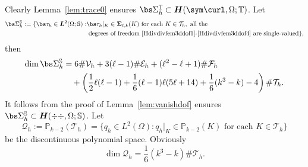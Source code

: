 Clearly Lemma~\ref{lem:trace0} ensures $\bs\Sigma_h^{\mathbb T}\subset \boldsymbol H(\sym\curl,\Omega;\mathbb T)$. 
%
Let
\begin{align*}
\bs\Sigma_h^{\mathbb S}:=\{\bs\tau_h\in \boldsymbol L^2(\Omega; \mathbb S): &\bs\tau_h|_K\in\boldsymbol \Sigma_{\ell,k}(K) \textrm{ for each } K\in\mathcal T_h, \textrm{ all the } \\
& \textrm{ degrees of freedom~\eqref{Hdivdivfem3ddof1}-\eqref{Hdivdivfem3ddof4} are single-valued} \},
\end{align*}
then
\begin{align*}
\dim\bs\Sigma_h^{\mathbb S}&= 6\#\mathcal V_h+ 3(\ell-1)\#\mathcal E_h + (\ell^2 -\ell+1)\#\mathcal F_h \\
&\quad+\left(\frac{1}{2}\ell(\ell-1)+ \frac{1}{6}(\ell-1)\ell(5\ell+14) + \frac{1}{6}(k^3-k)-4\right)\#\mathcal T_h.
\end{align*}
It follows from the proof of Lemma~\ref{lem:vanishdof} ensures $\bs\Sigma_h^{\mathbb S}\subset \boldsymbol H(\div\div,\Omega;\mathbb S)$.
%
Let 
$$
\mathcal Q_h :=\mathbb P_{k-2}(\mathcal T_h)=\{q_h\in L^2(\Omega): q_h|_K\in \mathbb P_{k-2}(K) \textrm{ for each } K\in\mathcal T_h\}
$$
be the discontinuous polynomial space. Obviously 
$$
\dim \mathcal Q_h = \frac{1}{6}(k^3 - k)\#\mathcal T_h.
$$


